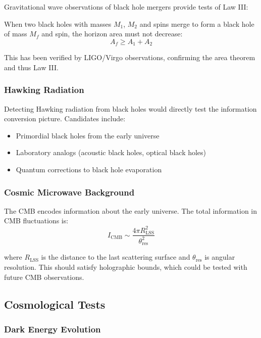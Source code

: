 \documentclass[11pt,a4paper]{article}
\theoremstyle{plain}
\theoremstyle{definition}
\theoremstyle{remark}
\begin{document}
Gravitational wave observations of black hole mergers provide tests of Law III:

When two black holes with masses $M_1$, $M_2$ and spins merge to form a black hole of mass $M_f$ and spin, the horizon area must not decrease:
\begin{equation}
A_f \geq A_1 + A_2
\end{equation}

This has been verified by LIGO/Virgo observations, confirming the area theorem and thus Law III.

\subsubsection{Hawking Radiation}

Detecting Hawking radiation from black holes would directly test the information conversion picture. Candidates include:

\begin{itemize}[leftmargin=*]
\item Primordial black holes from the early universe
\item Laboratory analogs (acoustic black holes, optical black holes)
\item Quantum corrections to black hole evaporation
\end{itemize}

\subsubsection{Cosmic Microwave Background}

The CMB encodes information about the early universe. The total information in CMB fluctuations is:
\begin{equation}
I_{\text{CMB}} \sim \frac{4\pi R_{\text{LSS}}^2}{\theta_{\text{res}}^2}
\end{equation}

where $R_{\text{LSS}}$ is the distance to the last scattering surface and $\theta_{\text{res}}$ is angular resolution. This should satisfy holographic bounds, which could be tested with future CMB observations.

\subsection{Cosmological Tests}

\subsubsection{Dark Energy Evolution}
\end{document}

